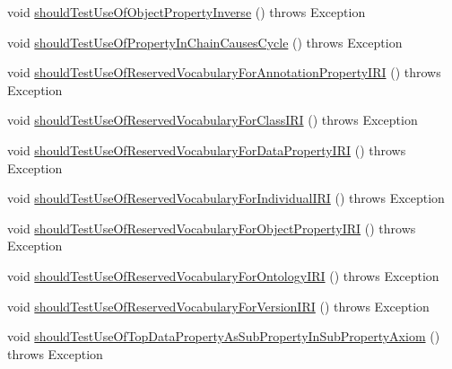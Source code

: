 \begin{DoxyCompactItemize}
\item 
void \hyperlink{classorg_1_1semanticweb_1_1owlapi_1_1contract_1_1_contract_owlapi_profiles_test_a62f94b172fb99a4d9d0e621fdcccbe32}{should\-Test\-Use\-Of\-Object\-Property\-Inverse} ()  throws Exception 
\item 
void \hyperlink{classorg_1_1semanticweb_1_1owlapi_1_1contract_1_1_contract_owlapi_profiles_test_a3ceddd1440d1aab17e1ec0d6e46978b4}{should\-Test\-Use\-Of\-Property\-In\-Chain\-Causes\-Cycle} ()  throws Exception 
\item 
void \hyperlink{classorg_1_1semanticweb_1_1owlapi_1_1contract_1_1_contract_owlapi_profiles_test_ad3bcf6d9c8a71a9a05d88d08e2ffa293}{should\-Test\-Use\-Of\-Reserved\-Vocabulary\-For\-Annotation\-Property\-I\-R\-I} ()  throws Exception 
\item 
void \hyperlink{classorg_1_1semanticweb_1_1owlapi_1_1contract_1_1_contract_owlapi_profiles_test_a08400ad0a2437b4a9848fd94492b28e3}{should\-Test\-Use\-Of\-Reserved\-Vocabulary\-For\-Class\-I\-R\-I} ()  throws Exception 
\item 
void \hyperlink{classorg_1_1semanticweb_1_1owlapi_1_1contract_1_1_contract_owlapi_profiles_test_a79889f6b9253d3fd0c7119b10d57797d}{should\-Test\-Use\-Of\-Reserved\-Vocabulary\-For\-Data\-Property\-I\-R\-I} ()  throws Exception 
\item 
void \hyperlink{classorg_1_1semanticweb_1_1owlapi_1_1contract_1_1_contract_owlapi_profiles_test_a25c3a98a943346e95f467664206132d5}{should\-Test\-Use\-Of\-Reserved\-Vocabulary\-For\-Individual\-I\-R\-I} ()  throws Exception 
\item 
void \hyperlink{classorg_1_1semanticweb_1_1owlapi_1_1contract_1_1_contract_owlapi_profiles_test_a37e0aa4f49dd4b14fadbb43704212e71}{should\-Test\-Use\-Of\-Reserved\-Vocabulary\-For\-Object\-Property\-I\-R\-I} ()  throws Exception 
\item 
void \hyperlink{classorg_1_1semanticweb_1_1owlapi_1_1contract_1_1_contract_owlapi_profiles_test_a1e163bc183da9d94f10c08cf47b1f99e}{should\-Test\-Use\-Of\-Reserved\-Vocabulary\-For\-Ontology\-I\-R\-I} ()  throws Exception 
\item 
void \hyperlink{classorg_1_1semanticweb_1_1owlapi_1_1contract_1_1_contract_owlapi_profiles_test_a4f457b88503c1a7871832ec05a3f6b11}{should\-Test\-Use\-Of\-Reserved\-Vocabulary\-For\-Version\-I\-R\-I} ()  throws Exception 
\item 
void \hyperlink{classorg_1_1semanticweb_1_1owlapi_1_1contract_1_1_contract_owlapi_profiles_test_a2a19055fb97dbd8605900defb49dc628}{should\-Test\-Use\-Of\-Top\-Data\-Property\-As\-Sub\-Property\-In\-Sub\-Property\-Axiom} ()  throws Exception 

\end{DoxyCompactItemize}
